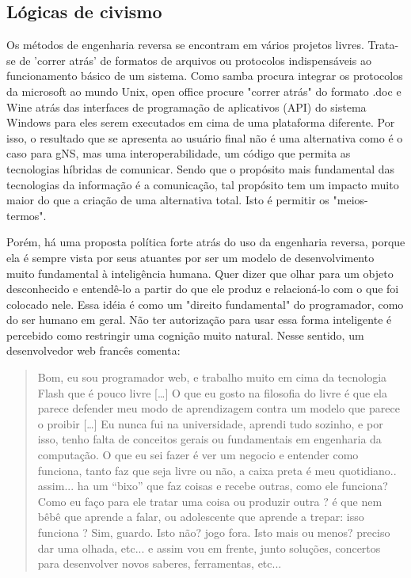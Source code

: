 \subsection{Lógicas de civismo} \label{3.3.2}

Os métodos de engenharia reversa se encontram em vários projetos livres. Trata-se de 'correr atrás' de formatos de arquivos ou protocolos indispensáveis ao funcionamento básico de um sistema. Como samba procura integrar os protocolos da microsoft ao mundo Unix, open office procure "correr atrás" do formato .doc e Wine atrás das interfaces de programação de aplicativos (API) do sistema Windows para eles serem executados em cima de uma plataforma diferente. Por isso, o resultado que se apresenta ao usuário final não é uma alternativa como é o caso para gNS, mas uma interoperabilidade, um código que permita as tecnologias híbridas de comunicar. Sendo que o propósito mais fundamental das tecnologias da informação é a comunicação, tal propósito tem um impacto muito maior do que a criação de uma alternativa total. Isto é permitir os "meios-termos".

Porém, há uma proposta política forte atrás do uso da engenharia reversa, porque ela é sempre vista por seus atuantes por ser um modelo de desenvolvimento muito fundamental à inteligência humana. Quer dizer que olhar para um objeto desconhecido e entendê-lo a partir do que ele produz e relacioná-lo com o que foi colocado nele. Essa idéia é  como um "direito fundamental" do programador, como do ser humano em geral. Não ter autorização para usar essa forma inteligente é percebido como restringir uma cognição muito natural. Nesse sentido, um desenvolvedor web francês comenta:

\begin{quote}
Bom, eu sou programador web, e trabalho muito em cima da tecnologia Flash que é pouco livre [\ldots] O que eu gosto na filosofia do livre é que ela parece defender meu modo de aprendizagem contra um modelo que parece o proibir […] Eu nunca fui na universidade, aprendi tudo sozinho, e por isso, tenho falta de conceitos gerais ou fundamentais em engenharia da computação. O que eu sei fazer é ver um negocio e entender como funciona, tanto faz que seja livre ou não, a caixa preta é meu quotidiano.. assim... ha um “bixo” que faz coisas e recebe outras, como ele funciona? Como eu faço para ele tratar uma coisa ou produzir outra ? é que nem bêbê que aprende a falar, ou adolescente que aprende a trepar: isso funciona ? Sim, guardo. Isto não? jogo fora. Isto mais ou menos? preciso dar uma olhada, etc... e assim vou em frente, junto soluções, concertos para desenvolver novos saberes, ferramentas, etc...
\end{quote}

